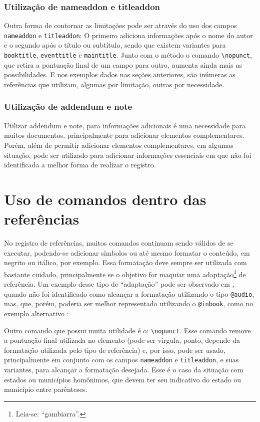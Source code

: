 \subsubsection{Utilização de nameaddon e titleaddon}
Outra forma de contornar as limitações pode ser através do uso dos campos \texttt{nameaddon} e \texttt{titleaddon}: O primeiro adiciona informações após o nome do autor e o segundo após o título ou subtítulo, sendo que existem variantes para \texttt{booktitle}, \texttt{eventtitle} e \texttt{maintitle}. Junto com o método o comando \verb|\nopunct|, que retira a pontuação final de um campo para outro, aumenta ainda mais as possibilidades. E nos exemplos dados nas seções anteriores, são inúmeras as referências que utilizam, algumas por limitação, outras por necessidade.

\subsubsection{Utilização de addendum e note}
Utilizar addendum e note, para informações adicionais é uma necessidade para muitos documentos, principalmente para adicionar elementos complementares. Porém, além de permitir adicionar elementos complementares, em algumas situação, pode ser utilizado para adicionar informações essenciais em que não foi identificada a melhor forma de realizar o registro.

\section{Uso de comandos dentro das referências}
No registro de referências, muitos comandos continuam sendo válidos de se executar, podendo-se adicionar símbolos ou até mesmo formatar o conteúdo, em negrito ou itálico, por exemplo. Essa formatação deve sempre ser utilizada com bastante cuidado, principalmente se o objetivo for maquiar uma adaptação\footnote{Leia-se: ``gambiarra''.} de referência. Um exemplo desse tipo de ``adaptação'' pode ser observado em \textcite{sonoro:ex3}, quando não foi identificado como alcançar a formatação utilizando o tipo \texttt{@audio}, mas, que, porém, poderia ser melhor representado utilizando o \texttt{@inbook}, como no exemplo alternativo \textcite{sonoro:ex3-alt}:


Outro comando que possui muita utilidade é o: \verb|\nopunct|. Esse comando remove a pontuação final utilizada no elemento (pode ser vírgula, ponto, depende da formatação utilizada pelo tipo de referência) e, por isso, pode ser usado, principalmente em conjunto com os campos \texttt{nameaddon} e \texttt{titleaddon}, e suas variantes, para alcançar a formatação desejada. Esse é o caso da situação com estados ou municípios homônimos, que devem ter seu indicativo do estado ou município entre parênteses.

